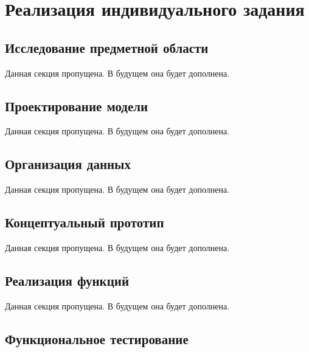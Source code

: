 \documentclass[12pt,a4paper,draft]{report}
\begin{document}
\chapter{Реализация индивидуального задания}



\section{Исследование предметной области}

Данная секция пропущена.
В будущем она будет дополнена.

\section{Проектирование модели}

Данная секция пропущена.
В будущем она будет дополнена.

\section{Организация данных}

Данная секция пропущена.
В будущем она будет дополнена.

\section{Концептуальный прототип}

Данная секция пропущена.
В будущем она будет дополнена.

\section{Реализация функций}

Данная секция пропущена.
В будущем она будет дополнена.

\section{Функциональное тестирование}
\end{document}
